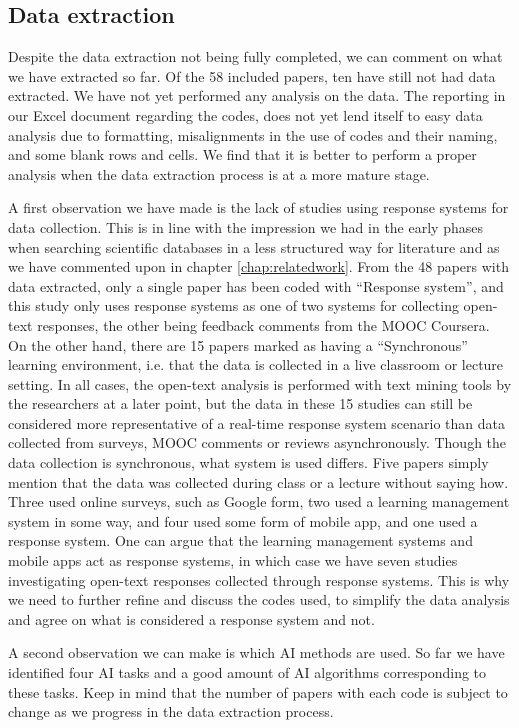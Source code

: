 \subsection{Data extraction}
Despite the data extraction not being fully completed, we can comment on what we have extracted so far. Of the 58 included papers, ten have still not had data extracted. We have not yet performed any analysis on the data. The reporting in our Excel document regarding the codes, does not yet lend itself to easy data analysis due to formatting, misalignments in the use of codes and their naming, and some blank rows and cells. We find that it is better to perform a proper analysis when the data extraction process is at a more mature stage.

A first observation we have made is the lack of studies using response systems for data collection. This is in line with the impression we had in the early phases when searching scientific databases in a less structured way for literature and as we have commented upon in chapter \ref{chap:relatedwork}. From the 48 papers with data extracted, only a single paper has been coded with ``Response system'', and this study only uses response systems as one of two systems for collecting open-text responses, the other being feedback comments from the MOOC Coursera. On the other hand, there are 15 papers marked as having a ``Synchronous'' learning environment, i.e. that the data is collected in a live classroom or lecture setting. In all cases, the open-text analysis is performed with text mining tools by the researchers at a later point, but the data in these 15 studies can still be considered more representative of a real-time response system scenario than data collected from surveys, MOOC comments or reviews asynchronously. Though the data collection is synchronous, what system is used differs. Five papers simply mention that the data was collected during class or a lecture without saying how. Three used online surveys, such as Google form, two used a learning management system in some way, and four used some form of mobile app, and one used a response system. One can argue that the learning management systems and mobile apps act as response systems, in which case we have seven studies investigating open-text responses collected through response systems. This is why we need to further refine and discuss the codes used, to simplify the data analysis and agree on what is considered a response system and not.

A second observation we can make is which AI methods are used. So far we have identified four AI tasks and a good amount of AI algorithms corresponding to these tasks. Keep in mind that the number of papers with each code is subject to change as we progress in the data extraction process.

